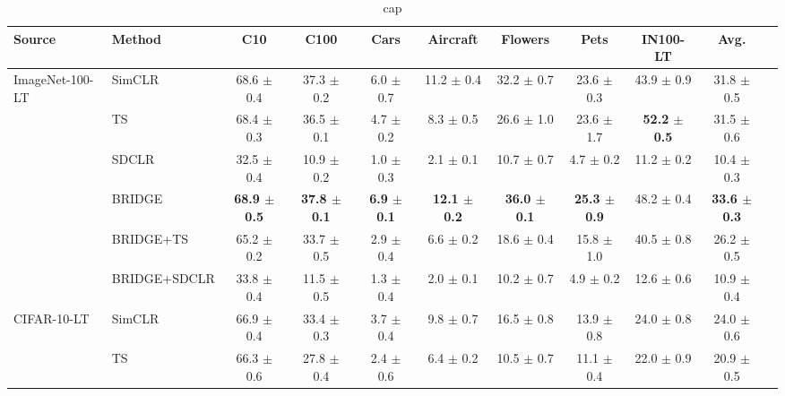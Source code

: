 \begin{table}[t]
\centering
\tiny
\setlength{\tabcolsep}{3.5pt}
\caption{cap}
\label{lab}
\begin{adjustbox}{max width=\textwidth}
\begin{tabular}{l l c c c c c c c c c}
\toprule
Source & Method & C10 & C100 & Cars & Aircraft & Flowers & Pets & IN100-LT & Avg. \\
\midrule
ImageNet-100-LT & SimCLR & 68.6 {\scriptsize$\pm$ 0.4} & 37.3 {\scriptsize$\pm$ 0.2} & 6.0 {\scriptsize$\pm$ 0.7} & 11.2 {\scriptsize$\pm$ 0.4} & 32.2 {\scriptsize$\pm$ 0.7} & 23.6 {\scriptsize$\pm$ 0.3} & 43.9 {\scriptsize$\pm$ 0.9} & 31.8 {\scriptsize$\pm$ 0.5} \\
 & TS & 68.4 {\scriptsize$\pm$ 0.3} & 36.5 {\scriptsize$\pm$ 0.1} & 4.7 {\scriptsize$\pm$ 0.2} & 8.3 {\scriptsize$\pm$ 0.5} & 26.6 {\scriptsize$\pm$ 1.0} & 23.6 {\scriptsize$\pm$ 1.7} & \textbf{52.2 {\scriptsize$\pm$ 0.5}} & 31.5 {\scriptsize$\pm$ 0.6} \\
 & SDCLR & 32.5 {\scriptsize$\pm$ 0.4} & 10.9 {\scriptsize$\pm$ 0.2} & 1.0 {\scriptsize$\pm$ 0.3} & 2.1 {\scriptsize$\pm$ 0.1} & 10.7 {\scriptsize$\pm$ 0.7} & 4.7 {\scriptsize$\pm$ 0.2} & 11.2 {\scriptsize$\pm$ 0.2} & 10.4 {\scriptsize$\pm$ 0.3} \\
 & BRIDGE & \textbf{68.9 {\scriptsize$\pm$ 0.5}} & \textbf{37.8 {\scriptsize$\pm$ 0.1}} & \textbf{6.9 {\scriptsize$\pm$ 0.1}} & \textbf{12.1 {\scriptsize$\pm$ 0.2}} & \textbf{36.0 {\scriptsize$\pm$ 0.1}} & \textbf{25.3 {\scriptsize$\pm$ 0.9}} & 48.2 {\scriptsize$\pm$ 0.4} & \textbf{33.6 {\scriptsize$\pm$ 0.3}} \\
 & BRIDGE+TS & 65.2 {\scriptsize$\pm$ 0.2} & 33.7 {\scriptsize$\pm$ 0.5} & 2.9 {\scriptsize$\pm$ 0.4} & 6.6 {\scriptsize$\pm$ 0.2} & 18.6 {\scriptsize$\pm$ 0.4} & 15.8 {\scriptsize$\pm$ 1.0} & 40.5 {\scriptsize$\pm$ 0.8} & 26.2 {\scriptsize$\pm$ 0.5} \\
 & BRIDGE+SDCLR & 33.8 {\scriptsize$\pm$ 0.4} & 11.5 {\scriptsize$\pm$ 0.5} & 1.3 {\scriptsize$\pm$ 0.4} & 2.0 {\scriptsize$\pm$ 0.1} & 10.2 {\scriptsize$\pm$ 0.7} & 4.9 {\scriptsize$\pm$ 0.2} & 12.6 {\scriptsize$\pm$ 0.6} & 10.9 {\scriptsize$\pm$ 0.4} \\
\midrule
CIFAR-10-LT & SimCLR & 66.9 {\scriptsize$\pm$ 0.4} & 33.4 {\scriptsize$\pm$ 0.3} & 3.7 {\scriptsize$\pm$ 0.4} & 9.8 {\scriptsize$\pm$ 0.7} & 16.5 {\scriptsize$\pm$ 0.8} & 13.9 {\scriptsize$\pm$ 0.8} & 24.0 {\scriptsize$\pm$ 0.8} & 24.0 {\scriptsize$\pm$ 0.6} \\
 & TS & 66.3 {\scriptsize$\pm$ 0.6} & 27.8 {\scriptsize$\pm$ 0.4} & 2.4 {\scriptsize$\pm$ 0.6} & 6.4 {\scriptsize$\pm$ 0.2} & 10.5 {\scriptsize$\pm$ 0.7} & 11.1 {\scriptsize$\pm$ 0.4} & 22.0 {\scriptsize$\pm$ 0.9} & 20.9 {\scriptsize$\pm$ 0.5} \\

\end{tabular}
\end{adjustbox}
\end{table}
